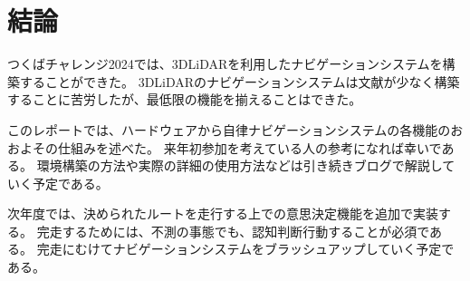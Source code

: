 \section{結論}
つくばチャレンジ2024では、3DLiDARを利用したナビゲーションシステムを構築することができた。
3DLiDARのナビゲーションシステムは文献が少なく構築することに苦労したが、最低限の機能を揃えることはできた。

このレポートでは、ハードウェアから自律ナビゲーションシステムの各機能のおおよその仕組みを述べた。
来年初参加を考えている人の参考になれば幸いである。
環境構築の方法や実際の詳細の使用方法などは引き続きブログで解説していく予定である。

次年度では、決められたルートを走行する上での意思決定機能を追加で実装する。
完走するためには、不測の事態でも、認知判断行動することが必須である。
完走にむけてナビゲーションシステムをブラッシュアップしていく予定である。